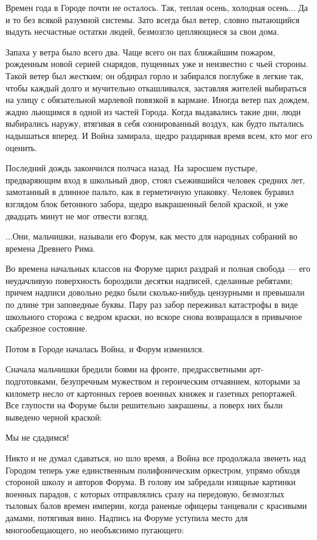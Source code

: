 \documentclass[a5paper]{article}
\begin{document}
Времен года в Городе почти не осталось. Так, теплая осень, холодная осень... Да и то без всякой разумной системы. Зато всегда был ветер, словно пытающийся выдуть несчастные остатки людей, безмозгло цепляющиеся за свои дома.

Запаха у ветра было всего два. Чаще всего он пах ближайшим пожаром, рожденным новой серией снарядов, пущенных уже и неизвестно с чьей стороны. Такой ветер был жестким; он обдирал горло и забирался поглубже в легкие так, чтобы каждый долго и мучительно откашливался, заставляя жителей выбираться на улицу с обязательной марлевой повязкой в кармане. Иногда ветер пах дождем, жадно льющимся в одной из частей Города. Когда выдавались такие дни, люди выбирались наружу, втягивая в себя озонированный воздух, как будто пытались надышаться вперед. И Война замирала, щедро раздаривая время всем, кто мог его оценить.

Последний дождь закончился полчаса назад. На заросшем пустыре, предваряющим вход в школьный двор, стоял съежившийся человек средних лет, замотанный в длинное пальто, как в герметичную упаковку. Человек буравил взглядом блок бетонного забора, щедро выкрашенный белой краской, и уже двадцать минут не мог отвести взгляд.

...Они, мальчишки, называли его Форум, как место для народных собраний во времена Древнего Рима.

Во времена начальных классов на Форуме царил раздрай и полная свобода --- его неудачливую поверхность бороздили десятки надписей, сделанные ребятами; причем надписи довольно редко были сколько-нибудь цензурными и превышали по длине три заповедные буквы. Пару раз забор переживал катастрофы в виде школьного сторожа с ведром краски, но вскоре снова возвращался в привычное скабрезное состояние.

Потом в Городе началась Война, и Форум изменился.

Сначала мальчишки бредили боями на фронте, предрассветными арт-подготовками, безупречным мужеством и героическим отчаянием, которыми за километр несло от картонных героев военных книжек и газетных репортажей. Все глупости на Форуме были решительно закрашены, а поверх них были выведено черной краской:

Мы не сдадимся!

Никто и не думал сдаваться, но шло время, а Война все продолжала звенеть над Городом теперь уже единственным полифоническим оркестром, упрямо обходя стороной школу и авторов Форума. В голову им забредали изящные картинки военных парадов, с которых отправлялись сразу на передовую, безмозглых тыловых балов времен империи, когда раненые офицеры танцевали с красивыми дамами, потягивая вино. Надпись на Форуме уступила место для многообещающего, но необъяснимо пугающего:
\end{document}
